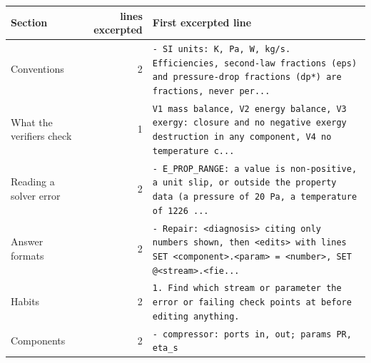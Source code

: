 \begingroup\small\renewcommand{\arraystretch}{1.12}\begin{tabular}{@{}p{3.0cm}rp{9.0cm}@{}}\toprule
Section & lines excerpted & First excerpted line \\
\midrule
Conventions & 2 & \texttt{- SI units: K, Pa, W, kg/s. Efficiencies, second-law fractions (eps) and pressure-drop fractions (dp*) are fractions, never per...} \\
What the verifiers check & 1 & \texttt{V1 mass balance, V2 energy balance, V3 exergy: closure and no negative exergy destruction in any component, V4 no temperature c...} \\
Reading a solver error & 2 & \texttt{- E\_PROP\_RANGE: a value is non-positive, a unit slip, or outside the property data (a pressure of 20 Pa, a temperature of 1226 ...} \\
Answer formats & 2 & \texttt{- Repair: <diagnosis> citing only numbers shown, then <edits> with lines SET <component>.<param> = <number>, SET @<stream>.<fie...} \\
Habits & 2 & \texttt{1. Find which stream or parameter the error or failing check points at before editing anything.} \\
Components & 2 & \texttt{- compressor: ports in, out; params PR, eta\_s} \\
\bottomrule
\end{tabular}\endgroup
